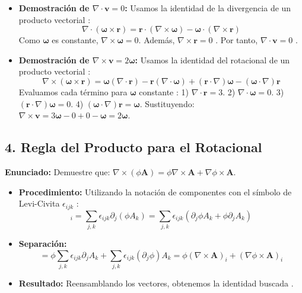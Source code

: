 \documentclass[a4paper]{article}
\begin{document}
\begin{itemize}
    \item \textbf{Demostración de $\nabla \cdot \mathbf{v} = 0$:} Usamos la identidad de la divergencia de un producto vectorial \cite{109}:
    \begin{equation}
        \nabla \cdot (\mathbf{\omega} \times \mathbf{r}) = \mathbf{r} \cdot (\nabla \times \mathbf{\omega}) - \mathbf{\omega} \cdot (\nabla \times \mathbf{r})
    \end{equation}
    Como $\mathbf{\omega}$ es constante, $\nabla \times \mathbf{\omega} = 0$. Además, $\nabla \times \mathbf{r} = 0$ \cite{109}. Por tanto, $\nabla \cdot \mathbf{v} = 0$ \cite{97}.

    \item \textbf{Demostración de $\nabla \times \mathbf{v} = 2\mathbf{\omega}$:} Usamos la identidad del rotacional de un producto vectorial \cite{109}:
    \begin{equation}
        \nabla \times (\mathbf{\omega} \times \mathbf{r}) = \mathbf{\omega}(\nabla \cdot \mathbf{r}) - \mathbf{r}(\nabla \cdot \mathbf{\omega}) + (\mathbf{r} \cdot \nabla)\mathbf{\omega} - (\mathbf{\omega} \cdot \nabla)\mathbf{r}
    \end{equation}
    Evaluamos cada término para $\mathbf{\omega}$ constante \cite{97, 109}:
    1) $\nabla \cdot \mathbf{r} = 3$. 2) $\nabla \cdot \mathbf{\omega} = 0$. 3) $(\mathbf{r} \cdot \nabla)\mathbf{\omega} = 0$. 4) $(\mathbf{\omega} \cdot \nabla)\mathbf{r} = \mathbf{\omega}$.
    Sustituyendo: $\nabla \times \mathbf{v} = 3\mathbf{\omega} - 0 + 0 - \mathbf{\omega} = 2\mathbf{\omega}$.
\end{itemize}

\subsection*{4. Regla del Producto para el Rotacional}
\textbf{Enunciado:} Demuestre que: $\nabla \times (\phi \mathbf{A}) = \phi \nabla \times \mathbf{A} + \nabla \phi \times \mathbf{A}$.

\begin{itemize}
    \item \textbf{Procedimiento:} Utilizando la notación de componentes con el símbolo de Levi-Civita $\epsilon_{ijk}$ \cite{95}:
    \begin{equation}
        [\nabla \times (\phi \mathbf{A})]_i = \sum_{j,k} \epsilon_{ijk} \partial_j (\phi A_k) = \sum_{j,k} \epsilon_{ijk} (\partial_j \phi A_k + \phi \partial_j A_k)
    \end{equation}
    \item \textbf{Separación:}
    \begin{equation}
        = \phi \sum_{j,k} \epsilon_{ijk} \partial_j A_k + \sum_{j,k} \epsilon_{ijk} (\partial_j \phi) A_k = \phi (\nabla \times \mathbf{A})_i + (\nabla \phi \times \mathbf{A})_i
    \end{equation}
    \item \textbf{Resultado:} Reensamblando los vectores, obtenemos la identidad buscada \cite{98, 109}.
\end{itemize}
\end{document}
